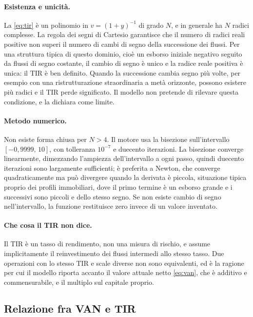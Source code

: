 \documentclass[11pt,a4paper]{article}
\theoremstyle{definition}
\theoremstyle{plain}
\begin{document}
\paragraph{Esistenza e unicità.} La \eqref{eq:tir} è un polinomio in $v=(1+y)^{-1}$ di grado $N$, e in generale ha $N$ radici complesse. La regola dei segni di Cartesio garantisce che il numero di radici reali positive non superi il numero di cambi di segno della successione dei flussi. Per una struttura tipica di questo dominio, cioè un esborso iniziale negativo seguito da flussi di segno costante, il cambio di segno è unico e la radice reale positiva è unica: il TIR è ben definito. Quando la successione cambia segno più volte, per esempio con una ristrutturazione straordinaria a metà orizzonte, possono esistere più radici e il TIR perde significato. Il modello non pretende di rilevare questa condizione, e la dichiara come limite.

\paragraph{Metodo numerico.} Non esiste forma chiusa per $N>4$. Il motore usa la bisezione sull'intervallo $[-0{,}9999,\,10]$, con tolleranza $10^{-7}$ e duecento iterazioni. La bisezione converge linearmente, dimezzando l'ampiezza dell'intervallo a ogni passo, quindi duecento iterazioni sono largamente sufficienti; è preferita a Newton, che converge quadraticamente ma può divergere quando la derivata è piccola, situazione tipica proprio dei profili immobiliari, dove il primo termine è un esborso grande e i successivi sono piccoli e dello stesso segno. Se non esiste cambio di segno nell'intervallo, la funzione restituisce zero invece di un valore inventato.

\paragraph{Che cosa il TIR non dice.} Il TIR è un tasso di rendimento, non una misura di rischio, e assume implicitamente il reinvestimento dei flussi intermedi allo stesso tasso. Due operazioni con lo stesso TIR e scale diverse non sono equivalenti, ed è la ragione per cui il modello riporta accanto il valore attuale netto \eqref{eq:van}, che è additivo e commensurabile, e il multiplo sul capitale proprio.

\subsection{Relazione fra VAN e TIR}
\end{document}
